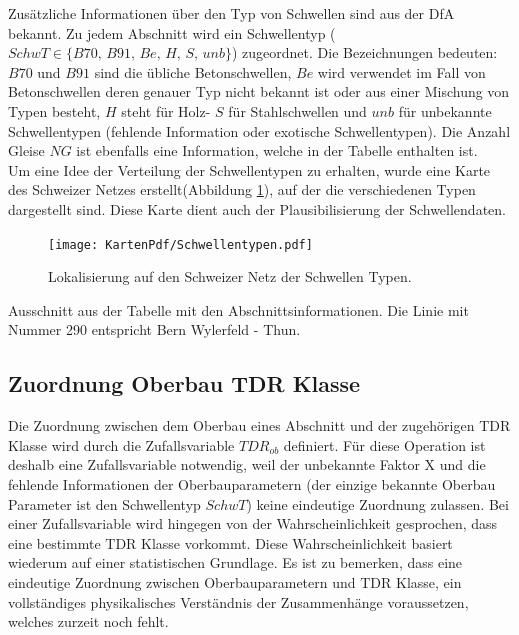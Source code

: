Zusätzliche Informationen über den Typ von Schwellen sind aus der DfA bekannt. Zu jedem Abschnitt wird ein Schwellentyp ($ SchwT \in \{ B70,\, B91, \,Be, \,H, \, S,\,unb \} $) zugeordnet. Die Bezeichnungen bedeuten: $B70$ und $B91$ sind die übliche Betonschwellen, $Be$ wird verwendet im Fall von Betonschwellen deren genauer Typ nicht bekannt ist oder aus einer Mischung von Typen besteht, $H$ steht für Holz- $S$ für Stahlschwellen und $unb$ für unbekannte Schwellentypen (fehlende Information oder exotische Schwellentypen).
Die Anzahl Gleise $NG$  ist ebenfalls eine Information, welche in der Tabelle enthalten ist.\\


Um eine Idee der Verteilung der Schwellentypen zu erhalten, wurde eine Karte des Schweizer Netzes erstellt(Abbildung \ref{F:SchwTyp}), auf der die verschiedenen Typen dargestellt sind. Diese Karte dient auch der Plausibilisierung der Schwellendaten. 
\begin{figure}
	\texttt{[image: KartenPdf/Schwellentypen.pdf]}
	\setcapwidth[c]{\textwidth}
	\caption{Lokalisierung auf den Schweizer Netz der Schwellen Typen.}
	\label{F:SchwTyp}
\end{figure}

\begin{table}[!htb]
\begin{center}
	\resizebox{\columnwidth}{!}{
	
	}
	\caption{Ausschnitt aus der Tabelle mit den Abschnittsinformationen. Die Linie mit Nummer 290  entspricht Bern Wylerfeld - Thun.}
	\label{T:bP}
\end{center}
\end{table}
\FloatBarrier
\subsection{Zuordnung Oberbau TDR Klasse}\label{S:Zuordnung}
Die Zuordnung zwischen dem Oberbau eines Abschnitt und der zugehörigen TDR Klasse wird durch die  Zufallsvariable $TDR_{ob}$ definiert. Für diese Operation ist deshalb eine Zufallsvariable notwendig, weil der unbekannte Faktor X und die fehlende Informationen der Oberbauparametern (der einzige bekannte Oberbau Parameter ist den Schwellentyp $SchwT$) keine eindeutige Zuordnung zulassen. Bei einer Zufallsvariable wird hingegen von der Wahrscheinlichkeit gesprochen, dass eine bestimmte TDR Klasse vorkommt. Diese Wahrscheinlichkeit basiert wiederum auf einer statistischen Grundlage. Es ist zu bemerken, dass eine eindeutige Zuordnung zwischen Oberbauparametern und TDR Klasse, ein vollständiges physikalisches Verständnis der Zusammenhänge voraussetzen, welches zurzeit noch fehlt.  \\

